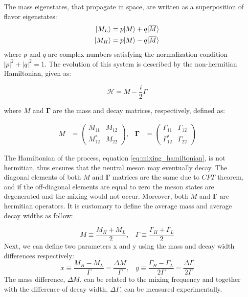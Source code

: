 The mass eigenstates, that propagate in space, are written as a superposition of flavor eigenstates:
\begin{equation}
    \begin{split}
        \lvert M_L\rangle = p \lvert M\rangle + q \lvert\overline{M}\rangle \\
        \lvert M_H\rangle = p \lvert M\rangle - q \lvert\overline{M}\rangle \\
    \end{split}
\end{equation}
 where $p$ and $q$ are complex numbers satisfying the normalization condition $|p|^{2}+|q|^{2} = 1$. 
 The evolution of this system is described by the non-hermitian Hamiltonian, given as:

\begin{equation}
\label{eq:mixing_hamiltonian}
    \mathcal{H}  = M - \frac{i}{2} \Gamma
\end{equation}

where $M$ and $\bm{\Gamma}$ are the mass and decay matrices, respectively, defined as:

\begin{align}
    M &= \left( \begin{matrix} M_{11} & M_{12}  \\ M_{12}^{*} & M_{22} \end{matrix} \right), & 
    \bm{\Gamma} &=  \left( \begin{matrix} \Gamma_{11} & \Gamma_{12}  \\ \Gamma_{12}^{*} & \Gamma_{22} \end{matrix} \right) 
\end{align}

The Hamiltonian of the process, equation \ref{eq:mixing_hamiltonian}, is not hermitian, thus ensures that the neutral meson may eventually decay. The diagonal elements of both $M$ and $\bm{\Gamma}$ matrices are the same due to $CPT$  theorem, and if the off-diagonal elements are equal to zero the meson states are degenerated and the mixing would not occur. Moreover, both  $M$ and $\bm{\Gamma}$ are hermitian operators. It is customary to define the average mass and average decay widths as follow:

\begin{equation}
\label{eq:mass_gamma}
    M \equiv \frac{M_{H} + M_{L}}{2}, ~~~~
    \Gamma \equiv \frac{\Gamma_{H} + \Gamma_{L}}{2}
\end{equation}
Next, we can define two parameters x and y using the mass and decay width differences respectively:
\begin{equation}
\label{eq:x_y}
    x \equiv \frac{M_{H} - M_{L}}{\Gamma} = \frac{\Delta M}{\Gamma}, ~~~~
    y \equiv \frac{\Gamma_{H} - \Gamma_{L}}{2 \Gamma} = \frac{\Delta \Gamma}{2 \Gamma}
\end{equation}
The mass difference, $\Delta M$, can be related to the mixing frequency and together with the difference of decay width, $\Delta \Gamma$, can be measured experimentally.

